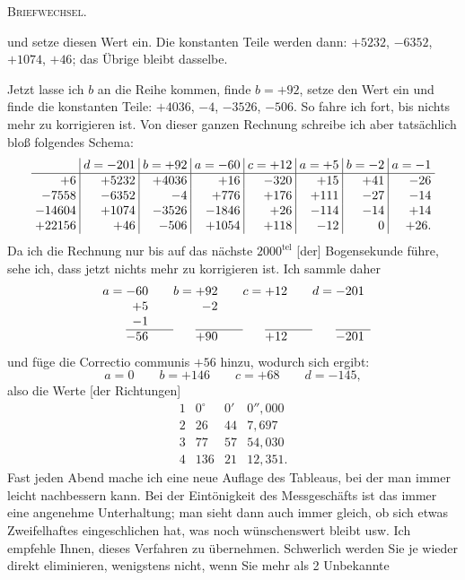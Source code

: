 \clearpage
{}\hfill\textsc{Briefwechsel.}\hfill\mbox{}\par\medskip
\noindent und setze diesen Wert ein. Die konstanten Teile werden dann: $+5232$, $-6352$, $+1074$, $+46$; das Übrige bleibt dasselbe.

Jetzt lasse ich $b$ an die Reihe kommen, finde $b=+92$, setze den Wert ein und finde die konstanten Teile: $+4036$, $-4$, $-3526$, $-506$. So fahre ich fort, bis nichts mehr zu korrigieren ist. Von dieser ganzen Rechnung schreibe ich aber tatsächlich bloß folgendes Schema:
\[
\setlength{\arraycolsep}{3pt}
\begin{array}{r|r|r|r|r|r|r|r}
&d=-201&b=+92&a=-60&c=+12&a=+5&b=-2&a=-1\\ \hline
+6&+5232&+4036&+16&-320&+15&+41&-26\\
-7558&-6352&-4&+776&+176&+111&-27&-14\\
-14604&+1074&-3526&-1846&+26&-114&-14&+14\\
+22156&+46&-506&+1054&+118&-12&0&+26.
\end{array}
\]
Da ich die Rechnung nur bis auf das nächste $2000^{\mathrm{tel}}$ [der] Bogensekunde führe, sehe ich, dass jetzt nichts mehr zu korrigieren ist. Ich sammle daher
\[
\begin{array}{r@{\;}c@{\;}r@{\qquad}r@{\;}c@{\;}r@{\qquad}r@{\;}c@{\;}r@{\qquad}r@{\;}c@{\;}r}
a&=&-60&b&=&+92&c&=&+12&d&=&-201\\
&&+5&&&-2&&&&&&\\
&&-1&&&&&&&&&\\ \cline{3-3}\cline{6-6}\cline{9-9}\cline{12-12}
&&-56&&&+90&&&+12&&&-201
\end{array}
\]
und füge die Correctio communis $+56$ hinzu, wodurch sich ergibt:
\[
a=0\qquad b=+146\qquad c=+68\qquad d=-145,
\]
also die Werte [der Richtungen]
\[
\begin{array}{r|rrr}
1&0^\circ&0'&0''{,}000\\
2&26&44&7{,}697\\
3&77&57&54{,}030\\
4&136&21&12{,}351.
\end{array}
\]
Fast jeden Abend mache ich eine neue Auflage des Tableaus, bei der man immer leicht nachbessern kann. Bei der Eintönigkeit des Messgeschäfts ist das immer eine angenehme Unterhaltung; man sieht dann auch immer gleich, ob sich etwas Zweifelhaftes eingeschlichen hat, was noch wünschenswert bleibt usw. Ich empfehle Ihnen, dieses Verfahren zu übernehmen. Schwerlich werden Sie je wieder direkt eliminieren, wenigstens nicht, wenn Sie mehr als 2 Unbekannte

